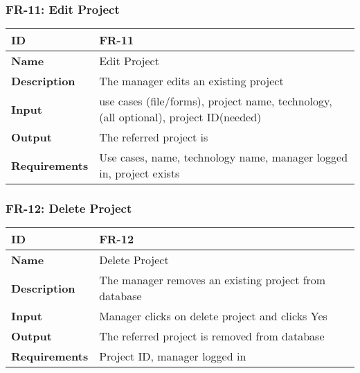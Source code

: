     

    \subsubsection{FR-11: Edit Project}
    \begin{center}
        \begin{tabularx}{\textwidth}{|l|X|}
            \hline
            \textbf{ID} & FR-11 \\
            \hline
            \textbf{Name} & Edit Project \\
            \hline
            \textbf{Description} & The manager edits an existing project \\
            \hline
            \textbf{Input} & use cases (file/forms), project name, technology, (all optional), project ID(needed) \\
            \hline
            \textbf{Output} & The referred project is  \\
            \hline
            \textbf{Requirements} & Use cases, name, technology name, manager logged in, project exists \\
            \hline
        \end{tabularx}
    \end{center}
    
    

    \subsubsection{FR-12: Delete Project}
    \begin{center}
        \begin{tabularx}{\textwidth}{|l|X|}
            \hline
            \textbf{ID} & FR-12 \\
            \hline
            \textbf{Name} & Delete Project \\
            \hline
            \textbf{Description} & The manager removes an existing project from database \\
            \hline
            \textbf{Input} & Manager clicks on delete project and clicks Yes \\
            \hline
            \textbf{Output} & The referred project is removed from database \\
            \hline
            \textbf{Requirements} & Project ID, manager logged in \\
            \hline
        \end{tabularx}
    \end{center}
    \newpage
    


